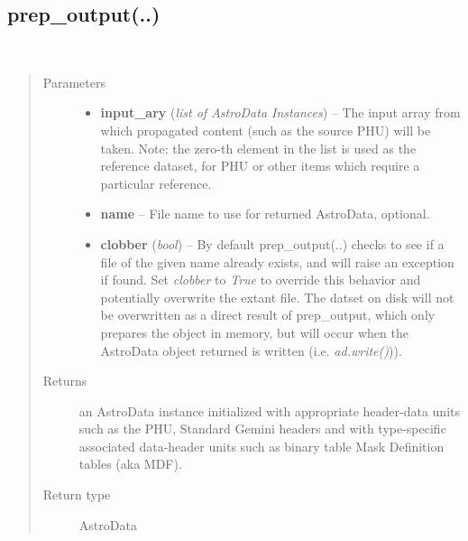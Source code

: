 \documentclass[letterpaper,10pt,english]{sphinxmanual}
\begin{document}
\subsection{prep\_output(..)}
\label{chapter_AstroDataClass:prep-output}

\begin{fulllineitems}
\label{chapter_AstroDataClass:astrodata.data.prep_output}~\begin{quote}\begin{description}
\item[{Parameters}] \leavevmode\begin{itemize}
\item {} 
\textbf{input\_ary} (\emph{list of AstroData Instances}) -- The input array from which propagated content (such as
the  source PHU) will be taken. Note: the zero-th element in the list
is  used as the reference dataset, for PHU or other items which require
a particular reference.

\item {} 
\textbf{name} -- File name to use for returned AstroData, optional.

\item {} 
\textbf{clobber} (\emph{bool}) -- By default prep\_output(..) checks to see if a file of the
given name already exists, and will raise an exception if found.
Set \emph{clobber} to \emph{True} to override this behavior and potentially
overwrite the extant file.  The datset on disk will not be overwritten
as a direct result of prep\_output, which only prepares the object
in memory, but will occur when the AstroData object returned is 
written (i.e. \emph{ad.write()})).

\end{itemize}

\item[{Returns}] \leavevmode
an AstroData instance initialized with appropriate
header-data units such as the PHU, Standard Gemini headers
and with type-specific associated  data-header units such as
binary table Mask Definition tables (aka MDF).

\item[{Return type}] \leavevmode
AstroData

\end{description}\end{quote}


\end{fulllineitems}
\end{document}

